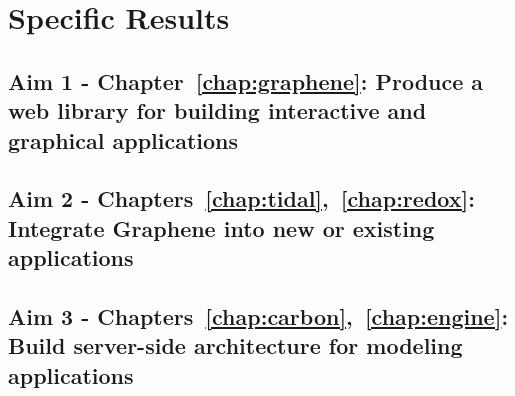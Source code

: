 \section{Specific Results}
\subsection{Aim 1 - Chapter~\ref{chap:graphene}: Produce a web library for building interactive and graphical applications}
\subsection{Aim 2 - Chapters~\ref{chap:tidal},~\ref{chap:redox}: Integrate Graphene into new or existing applications}
\subsection{Aim 3 - Chapters~\ref{chap:carbon},~\ref{chap:engine}: Build server-side architecture for modeling applications}

